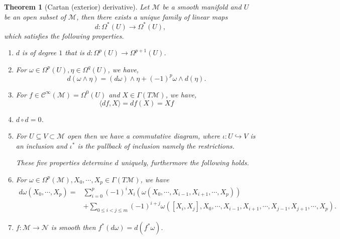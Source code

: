\documentclass[10pt]{article}
\newcommand\comsymb[2][\circlearrowleft]{%
  \arrow[mysymbol]{#2}[description]{#1}}
\newtheorem{theorem}{Theorem} [section]
\newcommand{\M}[0]{\mathcal{M}}
\newcommand{\maniN}[0]{\mathcal{N}}
\newcommand{\cinf}[0]{\mathcal{C}^\infty}
\begin{document}
\begin{theorem}[Cartan (exterior) derivative]
  \label{theorem_12_7}
  Let $\M$ be a smooth manifold and $U$ be an open subset of $\M$, then there exists a unique family of linear maps 
  \begin{equation*}
    d:\Omega^*(U)\to\Omega^*(U),
  \end{equation*}
  which satisfies the following properties.
  \begin{enumerate}[1).]
    \item $d$ is of degree $1$ that is $d:\Omega^p(U)\to\Omega^{p+1}(U)$.
    \item For $\omega\in\Omega^p(U),\eta\in\Omega^{q}(U)$, we have, 
      \begin{equation*}
        d(\omega\wedge\eta) = (d\omega)\wedge\eta+(-1)^p\omega\wedge d(\eta).
      \end{equation*}
    \item For $f\in\cinf(\M)=\Omega^0(U)$ and $X\in\Gamma(T\M)$, we have,
    \begin{equation*}
      \langle df,X\rangle = df(X) = Xf
    \end{equation*}
    \item $d\circ d = 0$.
    \item For $U\subseteq V\subset\M$ open then we have a commutative diagram, where $\iota:U\hookrightarrow V$ is an inclusion and $\iota^*$ is the pullback of inclusion namely the restrictions.
    \begin{center}
    \end{center}
    These five properties determine $d$ uniquely, furthermore the following holds.
    \item For $\omega\in\Omega^p(\M),X_0,\cdots,X_p\in\Gamma(T\M)$, we have
    \begin{align*}
      d\omega(X_0,\cdots,X_p) =& \sum_{i=0}^p(-1)^iX_i(\omega(X_0,\cdots,X_{i-1},X_{i+1},\cdots,X_p))\\
       & + \sum_{0\leq i<j\leq m}(-1)^{i+j}\omega([X_i,X_j],X_0,\cdots,X_{i-1},X_{i+1},\cdots,X_{j-1},X_{j+1},\cdots,X_p).
    \end{align*}
  \item $f:\M\to\maniN$ is smooth then $f^*(d\omega) = d(f^*\omega)$.
  \end{enumerate}
\end{theorem}
\end{document}
